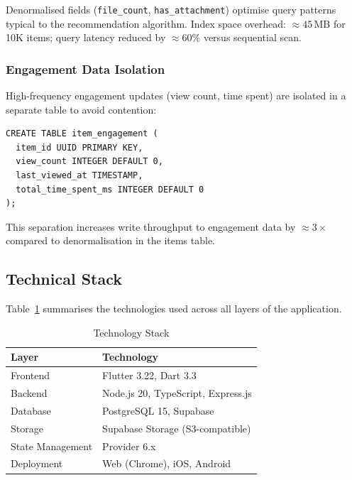 \documentclass[10pt,twocolumn,a4paper]{article}
\begin{document}
\noindent Denormalised fields (\texttt{file\_count}, \texttt{has\_attachment}) optimise query
patterns typical to the recommendation algorithm. Index space overhead: $\approx 45\,\text{MB}$
for 10K items; query latency reduced by $\approx 60\%$ versus sequential scan.

\subsubsection{Engagement Data Isolation}

High-frequency engagement updates (view count, time spent) are isolated in a separate table to
avoid contention:

\begin{lstlisting}[caption=Engagement Tracking,label={code:engagement},
    basicstyle=\ttfamily\tiny, frame=single]
CREATE TABLE item_engagement (
  item_id UUID PRIMARY KEY,
  view_count INTEGER DEFAULT 0,
  last_viewed_at TIMESTAMP,
  total_time_spent_ms INTEGER DEFAULT 0
);
\end{lstlisting}

\noindent This separation increases write throughput to engagement data by $\approx 3\times$
compared to denormalisation in the items table.

\subsection{Technical Stack}

Table~\ref{tab:techstack} summarises the technologies used across all layers of the
application.

\begin{table}[h]
\centering
\caption{Technology Stack}
\label{tab:techstack}
\small
\begin{tabular}{|l|l|}
\hline
\textbf{Layer}   & \textbf{Technology} \\
\hline
Frontend         & Flutter 3.22, Dart 3.3 \\
Backend          & Node.js 20, TypeScript, Express.js \\
Database         & PostgreSQL 15, Supabase \\
Storage          & Supabase Storage (S3-compatible) \\
State Management & Provider 6.x \\
Deployment       & Web (Chrome), iOS, Android \\
\hline
\end{tabular}
\end{table}
\end{document}
